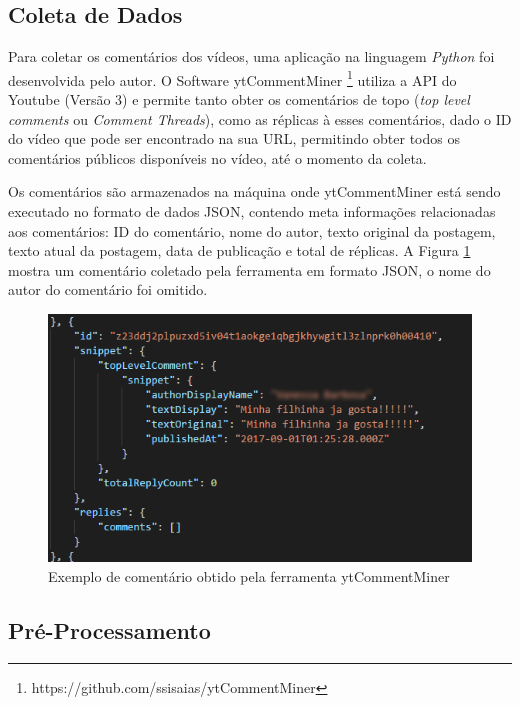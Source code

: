 \subsection{Coleta de Dados}
Para coletar os comentários dos vídeos, uma aplicação na linguagem \textit{Python} foi desenvolvida pelo autor. O Software ytCommentMiner \footnote{https://github.com/ssisaias/ytCommentMiner} utiliza a API do Youtube (Versão 3) e permite tanto obter os comentários de topo (\textit{top level comments} ou \textit{Comment Threads}), como as réplicas à esses comentários, dado o ID do vídeo que pode ser encontrado na sua URL, permitindo obter todos os comentários públicos disponíveis no vídeo, até o momento da coleta.

Os comentários são armazenados na máquina onde ytCommentMiner está sendo executado no formato de dados JSON, contendo meta informações relacionadas aos comentários: ID do comentário, nome do autor, texto original da postagem, texto atual da postagem, data de publicação e total de réplicas. A Figura \ref{fig:comentario_coletado} mostra um comentário coletado pela ferramenta em formato JSON, o nome do autor do comentário foi omitido.

\begin{figure}[H] %
	\caption{\label{fig:comentario_coletado} Exemplo de comentário obtido pela ferramenta ytCommentMiner}
	\begin{center}
	    \includegraphics[scale=1]{figuras/figura_comentario_coletado.png} %
	\end{center}
\end{figure}


\subsection{Pré-Processamento}

